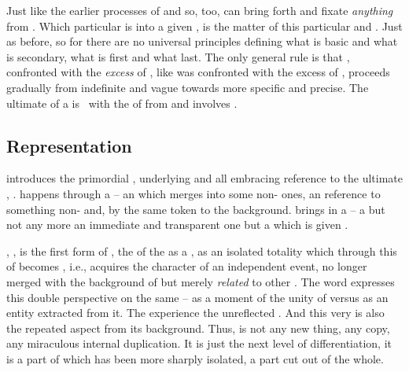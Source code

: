 \pa Just like the earlier processes of  and  so,
too,  can bring forth and fixate {\em anything} from
. Which particular  is  into a given
, is the matter of this particular  and
. Just as before, so for  there are no universal
principles defining what is basic and what is secondary, what is first and what
last. The only general rule is that , confronted with the {\em
  excess} of , like  was confronted with the
excess of , proceeds gradually from indefinite and vague towards more
specific and precise. The ultimate  of a  is
\equi\ with the  of  from  and involves
. 

\subsection{Representation}\label{sub:represent}%
\pa {} introduces the primordial , underlying
and all embracing reference to the ultimate , .
 happens through a  -- an  which
merges into some non- ones, an  reference to something
non- and, by the same token to the  background.
 brings in a  -- a  but not any more
an immediate and transparent one but a  which is given .

\label{pa:refrepet} 
, , is the first form of ,
the  of the   as a 
, as an isolated totality which through this  of
 becomes , i.e., acquires the character of an
independent event, no longer merged with the background of  but
merely {\em related} to other . The word
 expresses this double perspective on the same -- as a
moment of the unity of  versus as an entity extracted from it.
The  experience  the unreflected
. And this very  is also  the
repeated aspect from its background. Thus, 
 is not any new thing, any copy, any miraculous internal
duplication.  It is just the next level of differentiation, it is a part of
 which has been more sharply isolated, a  part
{cut} out of the whole.


